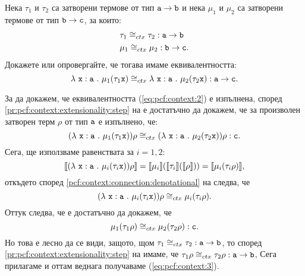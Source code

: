\begin{problem}

  
  Нека $\tau_1$ и $\tau_2$ са затворени термове от тип $\texttt{a}\to\texttt{b}$ и
  нека $\mu_1$ и $\mu_2$ са затворени термове от тип $\texttt{b}\to\texttt{c}$, за които:
  \begin{align*}
    & \tau_1 \cong_{ctx} \tau_2 : \texttt{a}\to\texttt{b}\\
    & \mu_1 \cong_{ctx} \mu_2 : \texttt{b}\to\texttt{c}.
  \end{align*}
  Докажете или опровергайте, че тогава имаме еквивалентността:
  \begin{equation}
    \label{eq:pcf:context:2}
    \lambda~\texttt{x}:\texttt{a}~.~{\mu_1(\tau_1 \texttt{x})} \cong_{ctx} \lambda~\texttt{x}:\texttt{a}~.~{\mu_2(\tau_2 \texttt{x})} : \texttt{a}\to\texttt{c}.
  \end{equation}
\end{problem}
\begin{hint}
  За да докажем, че еквивалентността (\ref{eq:pcf:context:2}) е изпълнена, според \ref{pr:pcf:context:extensionality:step} на  е достатъчно да докажем, че за произволен затворен терм $\rho$ от тип $\texttt{a}$ е изпълнено, че:
  \[(\lambda~\texttt{x}:\texttt{a}~.~{\mu_1(\tau_1 \texttt{x})})\rho \cong_{ctx} (\lambda~\texttt{x}:\texttt{a}~.~{\mu_2(\tau_2 \texttt{x})})\rho : \texttt{c}.\]
  Сега, ще използваме равенствата за $i = 1,2$:
  \[\llbracket{(\lambda~\texttt{x}:\texttt{a}~.~{\mu_i(\tau_i \texttt{x})})\rho}\rrbracket= \llbracket{\mu_i}\rrbracket(\llbracket{\tau_i}\rrbracket(\llbracket{\rho}\rrbracket)) = \llbracket{\mu_i(\tau_i \rho)}\rrbracket,\]
  откъдето според \ref{pcf:context:connection:denotational} на  следва, че
  \[(\lambda~\texttt{x}:\texttt{a}~.~{\mu_i(\tau_i \texttt{x})})\rho \cong_{ctx} \mu_i(\tau_i \rho).\]
  Оттук следва, че е достатъчно да докажем, че
  \begin{equation}
    \label{eq:pcf:context:3}
    \mu_1(\tau_1 \rho) \cong_{ctx} \mu_2(\tau_2 \rho) : \texttt{c}.
  \end{equation}
  Но това е лесно да се види, защото, щом $\tau_1 \cong_{ctx} \tau_2 : \texttt{a}\to\texttt{b}$,
  то според \ref{pr:pcf:context:extensionality:step} на  имаме, че
  $\tau_1\rho \cong_{ctx} \tau_2\rho : \texttt{a}\to\texttt{b}$,
  Сега прилагаме  и оттам веднага получаваме (\ref{eq:pcf:context:3}).
\end{hint}


